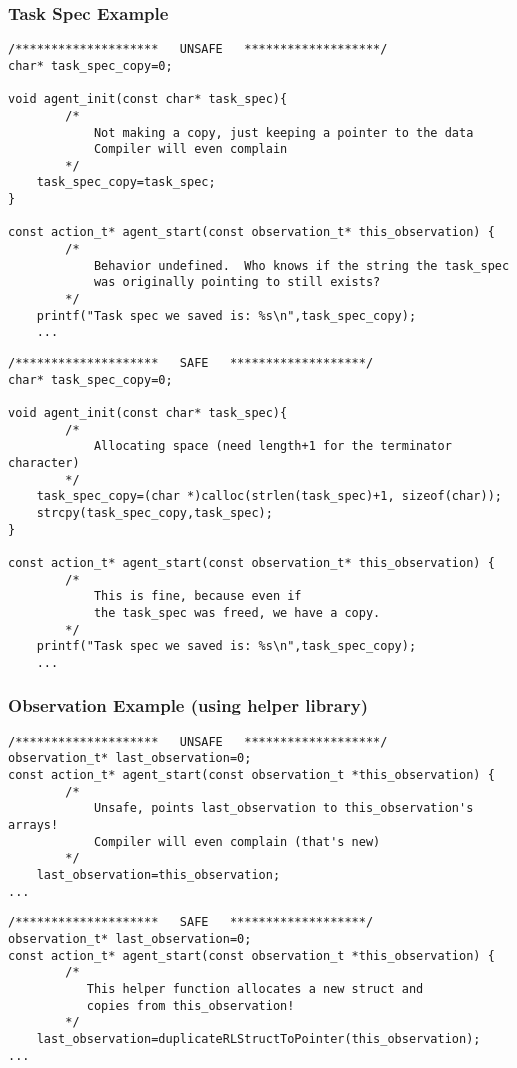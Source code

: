 \documentclass[11pt]{article}
\begin{document}
\subsubsection{Task Spec Example}
\begin{verbatim}
/********************   UNSAFE   *******************/
char* task_spec_copy=0;
	
void agent_init(const char* task_spec){
        /*
            Not making a copy, just keeping a pointer to the data
            Compiler will even complain 
        */
    task_spec_copy=task_spec;
}

const action_t* agent_start(const observation_t* this_observation) {
        /*
            Behavior undefined.  Who knows if the string the task_spec
            was originally pointing to still exists?
        */
    printf("Task spec we saved is: %s\n",task_spec_copy);
    ...
\end{verbatim}

\begin{verbatim}
/********************   SAFE   *******************/
char* task_spec_copy=0;
	
void agent_init(const char* task_spec){
        /*
            Allocating space (need length+1 for the terminator character)
        */
    task_spec_copy=(char *)calloc(strlen(task_spec)+1, sizeof(char));
    strcpy(task_spec_copy,task_spec);
}

const action_t* agent_start(const observation_t* this_observation) {
        /*
            This is fine, because even if 
            the task_spec was freed, we have a copy.
        */
    printf("Task spec we saved is: %s\n",task_spec_copy);
    ...
\end{verbatim}


\subsubsection{Observation Example (using helper library)}


\begin{verbatim}
/********************   UNSAFE   *******************/
observation_t* last_observation=0;
const action_t* agent_start(const observation_t *this_observation) {
        /*
            Unsafe, points last_observation to this_observation's arrays!
            Compiler will even complain (that's new)		
        */
    last_observation=this_observation;
...
\end{verbatim}

\begin{verbatim}
/********************   SAFE   *******************/
observation_t* last_observation=0;
const action_t* agent_start(const observation_t *this_observation) {
        /*
           This helper function allocates a new struct and 
           copies from this_observation!
        */
    last_observation=duplicateRLStructToPointer(this_observation);
...
\end{verbatim}
\end{document}
